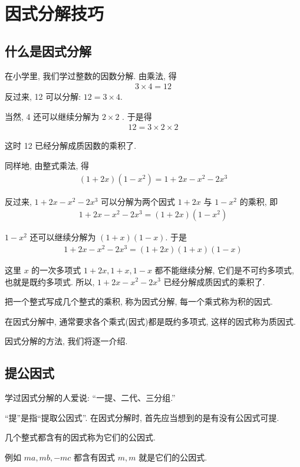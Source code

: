 \chapter{因式分解技巧}
\section*{什么是因式分解}
在小学里, 我们学过整数的因数分解. 由乘法, 得
\begin{align*}
	3 \times 4=12
\end{align*}
反过来, 12 可以分解: $12=3 \times 4$.

当然,  4 还可以继续分解为 $2 \times 2$ . 于是得
\begin{align*}
	12=3 \times 2 \times 2
\end{align*}

这时 12 已经分解成质因数的乘积了.

同样地, 由整式乘法, 得
\begin{align*}
	(1+2 x)\left(1-x^{2}\right)=1+2 x-x^{2}-2 x^{3}
\end{align*}

反过来,  $1+2 x-x^{2}-2 x^{3}$ 可以分解为两个因式 $1+2 x$ 与 $1-x^{2}$ 的乘积, 即
\begin{align*}
	1+2 x-x^{2}-2 x^{3}=(1+2 x)\left(1-x^{2}\right)
\end{align*}

$1-x^{2}$ 还可以继续分解为 $(1+x)(1-x)$. 于是
\begin{align*}
	1+2 x-x^{2}-2 x^{3}=(1+2 x)(1+x)(1-x)
\end{align*}

这里 $x$ 的一次多项式 $1+2 x ,  1+x ,  1-x$ 都不能继续分解, 它们是不可约多项式, 也就是既约多项式.  所以,  $1+2 x-x^{2}-2 x^{3}$ 已经分解成质因式的乘积了.

把一个整式写成几个整式的乘积, 称为因式分解, 每一个乘式称为积的因式.

在因式分解中, 通常要求各个乘式(因式)都是既约多项式, 这样的因式称为质因式.

因式分解的方法, 我们将逐一介绍.

\section{提公因式}
学过因式分解的人爱说: “一提、二代、三分组.”

“提”是指“提取公因式”. 在因式分解时, 首先应当想到的是有没有公因式可提.

几个整式都含有的因式称为它们的公因式.

例如 $m a ,  m b , -m c$ 都含有因式 $m, m$ 就是它们的公因式.

